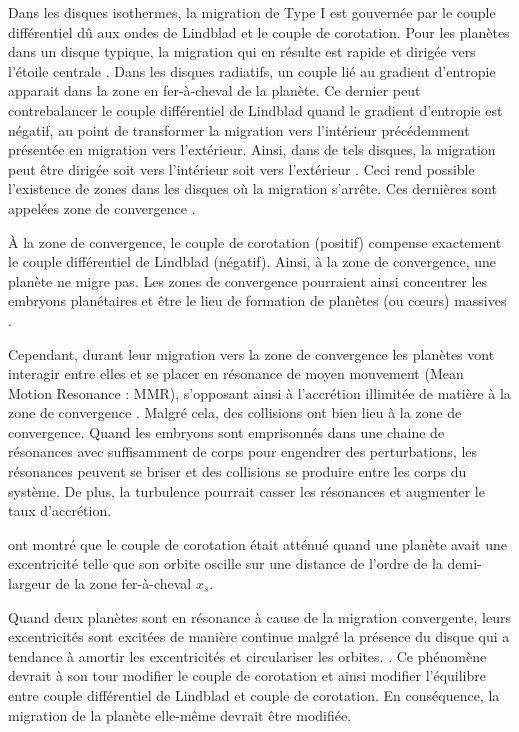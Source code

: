 Dans les disques isothermes, la migration de Type I est gouvernée par le couple différentiel dû aux ondes de Lindblad et le couple de corotation. Pour les planètes dans un disque typique, la migration qui en résulte est rapide et dirigée vers l'étoile centrale \citep{tanaka2002three}. Dans les disques radiatifs, un couple lié au gradient d'entropie apparait dans la zone en fer-à-cheval de la planète. Ce dernier peut contrebalancer le couple différentiel de Lindblad quand le gradient d'entropie est négatif, au point de transformer la migration vers l'intérieur précédemment présentée en migration vers l'extérieur. Ainsi, dans de tels disques, la migration peut être dirigée soit vers l'intérieur soit vers l'extérieur \citep{paardekooper2006halting, kley2008migration}. Ceci rend possible l'existence de zones dans les disques où la migration s'arrête. Ces dernières sont appelées zone de convergence \citep[CZs;][]{lyra2010orbital, mordasini2011application, paardekooper2011torque}.

\bigskip

À la zone de convergence, le couple de corotation (positif) compense exactement le couple différentiel de Lindblad (négatif). Ainsi, à la zone de convergence, une planète ne migre pas. Les zones de convergence pourraient ainsi concentrer les embryons planétaires et être le lieu de formation de planètes (ou cœurs) massives \citep{lyra2010orbital, horn2012orbital}. 

Cependant, durant leur migration vers la zone de convergence les planètes vont interagir entre elles et se placer en résonance de moyen mouvement (Mean Motion Resonance : MMR), s'opposant ainsi à l'accrétion illimitée de matière à la zone de convergence \citep{morbidelli2008building, sandor2011formation}. Malgré cela, des collisions ont bien lieu à la zone de convergence. Quand les embryons sont emprisonnés dans une chaine de résonances avec suffisamment de corps pour engendrer des perturbations, les résonances peuvent se briser et des collisions se produire entre les corps du système. De plus, la turbulence pourrait casser les résonances et augmenter le taux d'accrétion.

\bigskip

\cite{bitsch2010orbital} ont montré que le couple de corotation était atténué quand une planète avait une excentricité telle que son orbite oscille sur une distance de l'ordre de la demi-largeur de la zone fer-à-cheval $x_s$. 

Quand deux planètes sont en résonance à cause de la migration convergente, leurs excentricités sont excitées de manière continue
malgré la présence du disque qui a tendance à amortir les excentricités et circulariser les orbites. \citep[par exemple
][]{cresswell2008three}. Ce phénomène devrait à son tour modifier le couple de corotation et ainsi modifier l'équilibre entre
couple différentiel de Lindblad et couple de corotation. En conséquence, la migration de la planète elle-même devrait être
modifiée.

